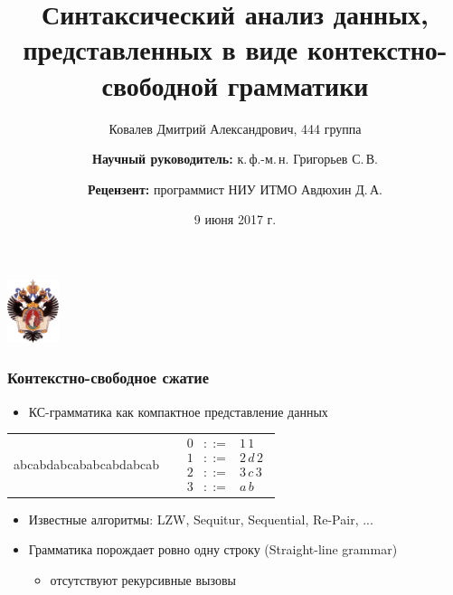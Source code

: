 \documentclass{beamer}
\title[]{Синтаксический анализ данных, представленных в виде контекстно-свободной грамматики}
\subtitle[]{}
\institute[СПбГУ]{
Санкт-Петербургский государственный университет \\
Кафедра системного программирования }
\author[Дмитрий Ковалев]{Ковалев Дмитрий Александрович, 444 группа \\
  \and  
    {\bfseries Научный руководитель:} к.\,ф.-м.\,н. Григорьев С.\,В. \\ 
  \and
    {\bfseries Рецензент:} программист НИУ ИТМО Авдюхин Д.\,А.}
\date{9 июня 2017 г.}
\begin{document}
{
\begin{frame}
  \begin{center}
  {\includegraphics[width=1.5cm]{pictures/SPbGU_Logo.png}}
  \end{center}
  \titlepage
\end{frame}
}

\begin{frame}[fragile]
  \transwipe[direction=90]
  \frametitle{Контекстно-свободное сжатие}
  \begin{itemize}
		\item КС-грамматика как компактное представление данных
  \end{itemize}
	\begin{table}
		\begin{tabular}{p{5cm} p{5cm}}
			\begin{center}
				abcabdabcababcabdabcab
			\end{center}
			&
			$$
			\begin{array}{crcl}
			&0 &::=& 1 \, 1 \\
			&1 & ::= & 2 \, d \, 2 \\
			&2 & ::= & 3 \, c \, 3\\
			&3 & ::= & a \, b
			\end{array}
			$$
		\end{tabular}
	\end{table}
	\begin{itemize}
		\item Известные алгоритмы: LZW, Sequitur, Sequential, Re-Pair, ...
		\item Грамматика порождает ровно одну строку (Straight-line grammar)
		\begin{itemize}
			\item отсутствуют рекурсивные вызовы
		\end{itemize}
	\end{itemize}
\end{frame}
\end{document}
